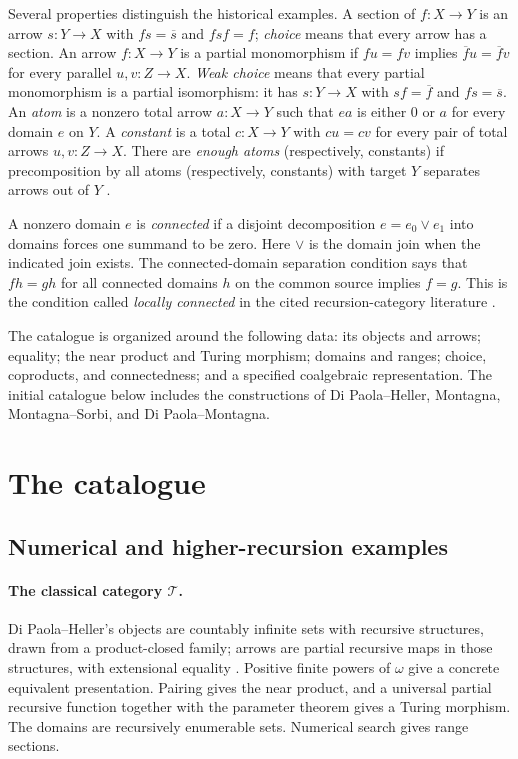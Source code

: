 \documentclass[11pt]{article}
\theoremstyle{definition}
\newcommand{\N}{\omega}
\begin{document}
Several properties distinguish the historical examples. A section of
$f:X\to Y$ is an arrow $s:Y\to X$ with $fs=\overline s$ and
$fsf=f$; \emph{choice} means that every arrow has a section.
An arrow $f:X\to Y$ is a partial monomorphism if $fu=fv$ implies
$\overline f u=\overline f v$ for every parallel $u,v:Z\to X$.
\emph{Weak choice} means that every partial monomorphism is a
partial isomorphism: it has $s:Y\to X$ with
$sf=\overline f$ and $fs=\overline s$.
An \emph{atom} is a nonzero total arrow $a:X\to Y$ such that
$ea$ is either $0$ or $a$ for every domain $e$ on $Y$.
A \emph{constant} is a total $c:X\to Y$ with $cu=cv$ for every
pair of total arrows $u,v:Z\to X$. There are \emph{enough atoms}
(respectively, constants) if precomposition by all atoms
(respectively, constants) with target $Y$ separates arrows out of
$Y$ \cite[\S\S6,8--9]{DPH}.

A nonzero domain $e$ is \emph{connected} if a disjoint decomposition
$e=e_0\vee e_1$ into domains forces one summand to be zero.
Here $\vee$ is the domain join when the indicated join exists.
The connected-domain separation condition says that $fh=gh$ for
all connected domains $h$ on the common source implies $f=g$.
This is the condition called \emph{locally connected} in the cited
recursion-category literature \cite[\S4]{DPM}.

The catalogue is organized around the following data: its objects and arrows; equality;
the near product and Turing morphism; domains and ranges; choice,
coproducts, and connectedness; and a specified coalgebraic representation.
The initial catalogue below includes the constructions of
Di Paola--Heller, Montagna, Montagna--Sorbi, and Di Paola--Montagna.

\section{The catalogue}
\subsection{Numerical and higher-recursion examples}

\paragraph{The classical category $\mathcal T$.}
Di Paola--Heller's objects are countably infinite sets with recursive
structures, drawn from a product-closed family; arrows are partial
recursive maps in those structures, with extensional equality
\cite[Theorem 4.3, pp.~601--602]{DPH}. Positive finite powers of $\N$
give a concrete equivalent presentation. Pairing gives the near product,
and a universal partial recursive function together with the parameter
theorem gives a Turing morphism. The domains are recursively enumerable
sets. Numerical search gives range sections.
\end{document}
